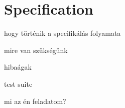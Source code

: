 \chapter{Specification}
hogy történik a specifikálás folyamata

mire van szükségünk

hibaágak

test suite

mi az én feladatom?